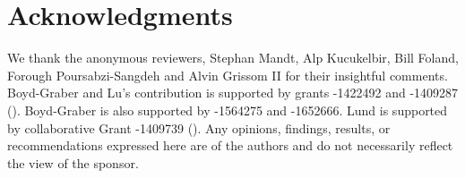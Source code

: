 \section*{Acknowledgments}
\label{sec:acknowledgments}

We thank the anonymous reviewers, Stephan Mandt, Alp Kucukelbir, Bill
Foland, Forough Poursabzi-Sangdeh and Alvin Grissom II for their
insightful comments. Boyd-Graber and Lu's contribution is supported by
 grants -1422492 and -1409287
().  Boyd-Graber is also supported by -1564275 and
-1652666.  Lund is supported by collaborative  Grant
-1409739 (). Any opinions, findings, results, or
recommendations expressed here are of the authors and do not
necessarily reflect the view of the sponsor.
